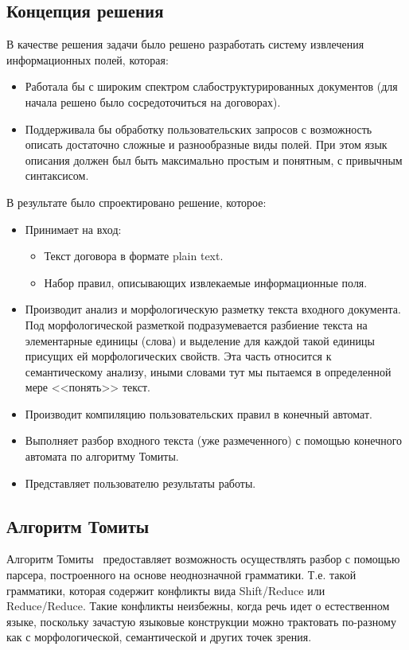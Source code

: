 \subsection{Концепция решения}
В качестве решения задачи было решено разработать систему извлечения информационных полей, которая:
\begin{itemize}
  \item Работала бы с широким спектром слабоструктурированных документов (для начала решено было сосредоточиться на договорах).
  \item Поддерживала бы обработку пользовательских запросов с возможность описать достаточно сложные и разнообразные виды полей. При этом язык описания должен был быть максимально простым и понятным, с привычным синтаксисом.
\end{itemize}
В результате было спроектировано решение, которое:
\begin{itemize}
  \item Принимает на вход:
  \begin{itemize}
    \item Текст договора в формате plain text.
    \item Набор правил, описывающих извлекаемые информационные поля.
  \end{itemize}
  \item Производит анализ и морфологическую разметку текста входного документа. Под морфологической разметкой подразумевается разбиение текста на элементарные единицы (слова) и выделение для каждой такой единицы присущих ей морфологических свойств. Эта часть относится к семантическому анализу, иными словами тут мы пытаемся в определенной мере <<понять>> текст.
  \item Производит компиляцию пользовательских правил в конечный автомат.
  \item Выполняет разбор входного текста (уже размеченного) с помощью конечного автомата по алгоритму Томиты.~\autocite{tomita-algorithm}
  \item Представляет пользователю результаты работы.
\end{itemize}

\subsection{Алгоритм Томиты}
Алгоритм Томиты~\autocite{tomita-algorithm} предоставляет возможность осуществлять разбор с помощью парсера, построенного на основе неоднозначной грамматики. Т.е. такой грамматики, которая содержит конфликты вида Shift/Reduce или Reduce/Reduce. Такие конфликты неизбежны, когда речь идет о естественном языке, поскольку зачастую языковые конструкции можно трактовать по-разному как с морфологической, семантической и других точек зрения.

